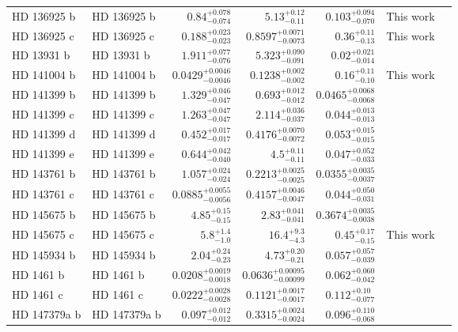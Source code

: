 \begin{longtable*}{llrrrrr}
HD 136925 b & HD 136925 b & $0.84^{+0.078}_{-0.074}$ & $5.13^{+0.12}_{-0.11}$ & $0.103^{+0.094}_{-0.070}$ & This work & \\ 
HD 136925 c & HD 136925 c & $0.188^{+0.023}_{-0.023}$ & $0.8597^{+0.0071}_{-0.0073}$ & $0.36^{+0.11}_{-0.13}$ & This work & \\ 
HD 13931 b & HD 13931 b & $1.911^{+0.077}_{-0.076}$ & $5.323^{+0.090}_{-0.091}$ & $0.02^{+0.021}_{-0.014}$ & \cite{Howard10} & \\ 
HD 141004 b & HD 141004 b & $0.0429^{+0.0046}_{-0.0046}$ & $0.1238^{+0.002}_{-0.002}$ & $0.16^{+0.11}_{-0.10}$ & This work & \\ 
HD 141399 b & HD 141399 b & $1.329^{+0.046}_{-0.047}$ & $0.693^{+0.012}_{-0.012}$ & $0.0465^{+0.0068}_{-0.0068}$ & \cite{Vogt14} & \\ 
HD 141399 c & HD 141399 c & $1.263^{+0.047}_{-0.047}$ & $2.114^{+0.036}_{-0.037}$ & $0.044^{+0.013}_{-0.013}$ & \cite{Vogt14} & \\ 
HD 141399 d & HD 141399 d & $0.452^{+0.017}_{-0.017}$ & $0.4176^{+0.0070}_{-0.0072}$ & $0.053^{+0.015}_{-0.015}$ & \cite{Vogt14} & \\ 
HD 141399 e & HD 141399 e & $0.644^{+0.042}_{-0.040}$ & $4.5^{+0.11}_{-0.11}$ & $0.047^{+0.052}_{-0.033}$ & \cite{Vogt14} & \\ 
HD 143761 b & HD 143761 b & $1.057^{+0.024}_{-0.024}$ & $0.2213^{+0.0025}_{-0.0025}$ & $0.0355^{+0.0035}_{-0.0037}$ & \cite{Noyes97} & \\ 
HD 143761 c & HD 143761 c & $0.0885^{+0.0055}_{-0.0056}$ & $0.4157^{+0.0046}_{-0.0047}$ & $0.044^{+0.050}_{-0.031}$ & \cite{Fulton16} & \\ 
HD 145675 b & HD 145675 b & $4.85^{+0.15}_{-0.15}$ & $2.83^{+0.041}_{-0.041}$ & $0.3674^{+0.0035}_{-0.0038}$ & \cite{Wittenmyer07} & \\ 
HD 145675 c & HD 145675 c & $5.8^{+1.4}_{-1.0}$ & $16.4^{+9.3}_{-4.3}$ & $0.45^{+0.17}_{-0.15}$ & This work & \\ 
HD 145934 b & HD 145934 b & $2.04^{+0.24}_{-0.23}$ & $4.73^{+0.20}_{-0.21}$ & $0.057^{+0.057}_{-0.039}$ & \cite{Feng15} & \\ 
HD 1461 b & HD 1461 b & $0.0208^{+0.0019}_{-0.0018}$ & $0.0636^{+0.00095}_{-0.00099}$ & $0.062^{+0.060}_{-0.042}$ & \cite{Rivera10} & \\ 
HD 1461 c & HD 1461 c & $0.0222^{+0.0028}_{-0.0028}$ & $0.1121^{+0.0017}_{-0.0017}$ & $0.112^{+0.10}_{-0.077}$ & \cite{Diaz16} & \\ 
HD 147379a b & HD 147379a b & $0.097^{+0.012}_{-0.012}$ & $0.3315^{+0.0024}_{-0.0024}$ & $0.096^{+0.110}_{-0.068}$ & \cite{Reiners18} & \\ 

\end{longtable*}
